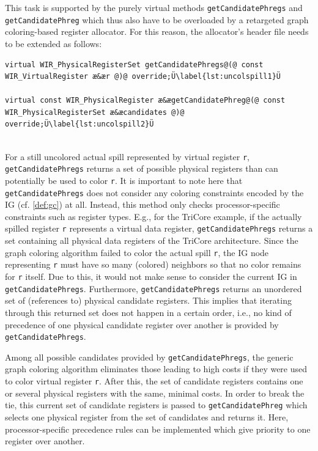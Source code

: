 This task is supported by the purely virtual methods \texttt{getCandidatePhregs} and \texttt{getCandidatePhreg} which thus also have to be overloaded by a retargeted graph coloring-based register allocator.
For this reason, the allocator's header file needs to be extended as follows: \\
\begin{lstlisting}[style=code,float=!ht,aboveskip=-0.8 \baselineskip,belowskip=-0.8 \baselineskip]
virtual WIR_PhysicalRegisterSet getCandidatePhregs@(@ const WIR_VirtualRegister æ&ær @)@ override;Ü\label{lst:uncolspill1}Ü

virtual const WIR_PhysicalRegister æ&ægetCandidatePhreg@(@ const WIR_PhysicalRegisterSet æ&æcandidates @)@ override;Ü\label{lst:uncolspill2}Ü
\end{lstlisting}
\\
For a still uncolored actual spill represented by virtual register \texttt{r}, \texttt{getCandidatePhregs} returns a set of possible physical registers than can potentially be used to color \texttt{r}.
It is important to note here that \texttt{getCandidatePhregs} does not consider any coloring constraints encoded by the \gls{IG} (cf. \cref{def:gc}) at all.
Instead, this method only checks processor-specific constraints such as register types.
E.g., for the TriCore example, if the actually spilled register \texttt{r} represents a virtual data register, \texttt{getCandidatePhregs} returns a set containing all physical data registers of the TriCore architecture.
Since the graph coloring algorithm failed to color the actual spill \texttt{r}, the \gls{IG} node representing \texttt{r} must have so many (colored) neighbors so that no color remains for \texttt{r} itself.
Due to this, it would not make sense to consider the current \gls{IG} in \texttt{getCandidatePhregs}.
Furthermore, \texttt{getCandidatePhregs} returns an unordered set of (references to) physical candidate registers.
This implies that iterating through this returned set does not happen in a certain order, i.e., no kind of precedence of one physical candidate register over another is provided by \texttt{getCandidatePhregs}.

Among all possible candidates provided by \texttt{getCandidatePhregs}, the generic graph coloring algorithm eliminates those leading to high costs if they were used to color virtual register \texttt{r}.
After this, the set of candidate registers contains one or several physical registers with the same, minimal costs.
In order to break the tie, this current set of candidate registers is passed to \texttt{getCandidatePhreg} which selects one physical register from the set of candidates and returns it.
Here, processor-specific precedence rules can be implemented which give priority to one register over another.

